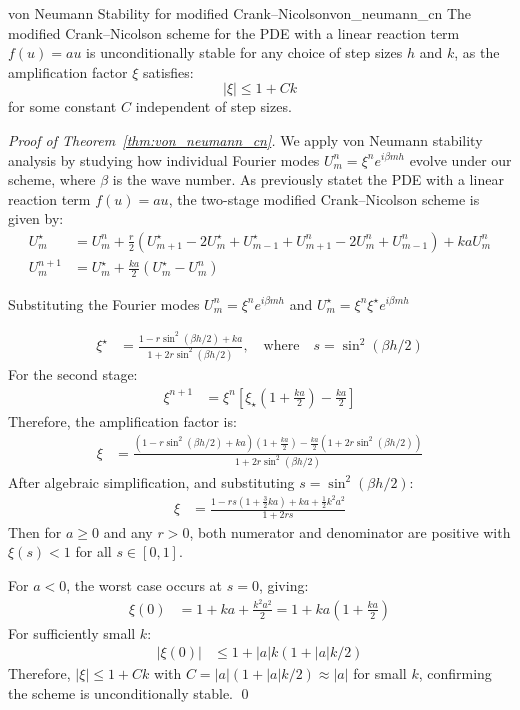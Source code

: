 \begin{theorem}{von Neumann Stability for modified Crank--Nicolson}{von_neumann_cn}
  The modified Crank--Nicolson scheme for the PDE with a linear reaction term $f(u) = au$ is unconditionally
  stable for any choice of step sizes $h$ and $k$, as the amplification factor $\xi$ satisfies:
  \[
    |\xi| \leq 1 + Ck
  \]
  for some constant $C$ independent of step sizes.
\end{theorem}

\begin{proof}[Proof of Theorem~\ref{thm:von_neumann_cn}]

  We apply von Neumann stability analysis by studying how individual Fourier modes $U_m^n = \xi^n e^{i\beta mh}$
  evolve under our scheme, where $\beta$ is the wave number.
  \medskip
  As previously statet the PDE with a linear reaction term $f(u) = au$, the two-stage modified Crank--Nicolson
  scheme is given by:
  \begin{align*}
    U_m^\star & = U_m^n + \frac{r}{2}\left(U_{m+1}^\star - 2U_m^\star + U_{m-1}^\star + U_{m+1}^n - 2U_m^n + U_{m-1}^n\right) + kaU_m^n \\
    U_m^{n+1} & = U_m^\star + \frac{ka}{2}(U_m^\star - U_m^n)
  \end{align*}

  Substituting the Fourier modes $U_m^n = \xi^n e^{i\beta mh}$ and $U_m^\star = \xi^n \xi^\star e^{i\beta mh}$

  \begin{align*}
    \xi^\star & = \frac{1 - r\sin^2(\beta h/2) + ka}{1 + 2r\sin^2(\beta h/2)}, \quad \text{where}\quad s = \sin^2(\beta h/2)
  \end{align*}
  For the second stage:
  \begin{align*}
    \xi^{n+1} & = \xi^n\left[\xi_\star\left(1 + \frac{ka}{2}\right) - \frac{ka}{2}\right]
  \end{align*}
  Therefore, the amplification factor is:
  \begin{align*}
    \xi & = \frac{\left(1 - r\sin^2(\beta h/2) + ka\right)\left(1 + \frac{ka}{2}\right) - \frac{ka}{2}\left(1 + 2r\sin^2(\beta h/2)\right)}{1 + 2r\sin^2(\beta h/2)}
  \end{align*}
  After algebraic simplification, and substituting $s = \sin^2(\beta h/2)$:
  \begin{align*}
    \xi & = \frac{1 - rs(1 + \tfrac{3}{2}ka) + ka + \tfrac{1}{2}k^2a^2}{1 + 2rs}
  \end{align*}
  Then for $a \geq 0$ and any $r > 0$, both numerator and denominator are positive with $\xi(s) < 1$ for all
  $s \in [0,1]$.

  For $a < 0$, the worst case occurs at $s = 0$, giving:
  \begin{align*}
    \xi(0) & = 1 + ka + \frac{k^2a^2}{2} = 1 + ka\left(1 + \frac{ka}{2}\right)
  \end{align*}
  For sufficiently small $k$:
  \begin{align*}
    |\xi(0)| & \leq 1 + |a|k(1 + |a|k/2)
  \end{align*}
  Therefore, $|\xi| \leq 1 + Ck$ with $C = |a|(1 + |a|k/2) \approx |a|$ for small $k$, confirming the scheme is unconditionally stable. \qed
\end{proof}
\clearpage
